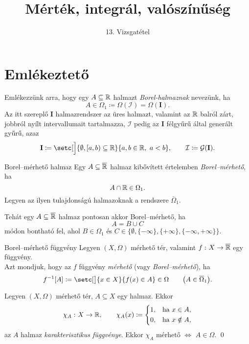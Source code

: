 \documentclass[
]{elteikthesis}[2024/04/26]
\title{Mérték, integrál, valószínűség} %
\subtitle{13. Vizsgatétel}
\begin{document}
	
	
	\section{Emlékeztető}
	
	Emlékezzünk arra, hogy egy \( A \subseteq \mathbb{R} \) halmazt \emph{Borel-halmaznak} nevezünk, ha
	\[
		A \in \Omega_1 \coloneq \Omega( \mathcal{I} ) = \Omega( \mathbf{I} ).
	\]
	Az itt szereplő \( \mathbf{I} \) halmazrendszer az üres halmazt, 
	valamint az \( \mathbb{R} \) balról zárt, jobbról nyílt intervallumait tartalmazza,
	\( \mathcal{I} \) pedig az \( \mathbf{I} \) félgyűrű által generált gyűrű, azaz
	\[
		\mathbf{I} \coloneq 
		\setc[\Big]{ \emptyset, [a, b) \subseteq \R }{ a, b \in \R, \ a < b }, \qquad
		\mathcal{I} \coloneq
		\mathcal{G}( \mathbf{I} ).
	\]
	\begin{definition}{Borel--mérhető halmaz}{}
		Egy \( A \subseteq \overline{\mathbb{R}} \) halmaz 
		kibővített értelemben \emph{Borel--mérhető}, ha
		\[
			A \cap \mathbb{R} \in \Omega_1.
		\]
		Legyen az ilyen tulajdonságú halmazoknak a rendszere \( \overline{\Omega}_1 \).
	\end{definition}
	
	\begin{note}
		Tehát egy \( A \subseteq \overline{ \mathbb{R} } \) halmaz pontosan akkor Borel--mérhető, ha
		\[
			A = B \cup C
		\]
		módon bontható fel, ahol \( B \in \Omega_1 \) és 
		\( C \in \bigl\{ \emptyset, \{ -\infty \}, \{ +\infty \}, \{ -\infty, +\infty \} \bigr\} \).
	\end{note}
	
	\begin{definition}{Borel--mérhető függvény}{}
		Legyen \( (X, \Omega) \) mérhető tér, 
		valamint \( f \,\colon X \to \overline{\mathbb{R}} \) egy függvény.\\[6pt]
		Azt mondjuk, hogy az \( f \) függvény \emph{mérhető} (vagy \emph{Borel--mérhető}), ha
		\[
		f^{-1}[A] \coloneq
		\setc[\big]{ x \in X }{ f(x) \in A } \in \Omega
		\qquad \bigl( A \in \overline{\Omega}_1 \bigr).
		\]
	\end{definition}
	\begin{example}
		Legyen \( (X, \Omega) \) mérhető tér, \( A \subseteq X \) egy halmaz. Ekkor
		\[
		\chi_A \,\colon X \to \mathbb{R}, \qquad
		\chi_A(x) \coloneq 
		\left\{
		\begin{aligned}
			1, & \quad \text{ha } x \in A, \\
			0, & \quad \text{ha } x \notin A, \\
		\end{aligned}
		\right.
		\]
		az \( A \) halmaz \emph{karakterisztikus függvénye}.
		Ekkor \( \chi_A \) mérhető \( \iff \) \( A \in \Omega \). \qed
	\end{example}
	
\end{document}
